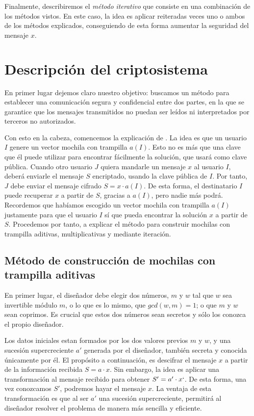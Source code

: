     Finalmente, describiremos el \textit{método iterativo} que consiste en una combinación de los métodos vistos. En este caso, la idea es aplicar reiteradas veces uno o ambos de los métodos explicados, conseguiendo de esta forma aumentar la seguridad del mensaje $x$.

    \section{Descripción del criptosistema}

    En primer lugar dejemos claro nuestro objetivo: buscamos un método para establecer una comunicación segura y confidencial entre dos partes, en la que se garantice que los mensajes transmitidos no puedan ser leídos ni interpretados por terceros no autorizados.

    Con esto en la cabeza, comencemos la explicación de \cite{artMH}. La idea es que un usuario $I$ genere un vector mochila con trampilla $a(I)$. Esto no es más que una clave que él puede utilizar para encontrar fácilmente la solución, que usará como clave pública. Cuando otro usuario $J$ quiera mandarle un mensaje $x$ al usuario $I$, deberá enviarle el mensaje $S$ encriptado, usando la clave pública de $I$. Por tanto, $J$ debe enviar el mensaje cifrado $S = x \cdot a(I)$. De esta forma, el destinatario $I$ puede recuperar $x$ a partir de $S$, gracias a $a(I)$, pero nadie más podrá. Recordemos que habíamos escogido un vector mochila con trampilla $a(I)$ justamente para que el usuario $I$ sí que pueda encontrar la solución $x$ a partir de $S$. Procedemos por tanto, a explicar el método para construir mochilas con trampilla aditivas, multiplicativas y mediante iteración. 
    
    \subsection{Método de construcción de mochilas con trampilla aditivas} \label{sec:3.3.1}
    
    En primer lugar, el diseñador debe elegir dos números, $m$ y $w$ tal que $w$ sea invertible módulo $m$, o lo que es lo mismo, que $gcd(w,m) = 1$; o que $m$ y $w$ sean coprimos. Es crucial que estos dos números sean secretos y sólo los conozca el propio diseñador.

    Los datos iniciales estan formados por los dos valores previos $m$ y $w$, y una sucesión supercreciente $a'$ generada por el diseñador, también secreta y conocida únicamente por él. El propósito a continuación, es descifrar el mensaje $x$ a partir de la información recibida $S = a \cdot x$. Sin embargo, la idea es aplicar una transformación al mensaje recibido para obtener $S' = a' \cdot x`$. De esta forma, una vez conozcamos $S'$, podremos hayar el mensaje $x$. La ventaja de esta transformación es que al ser $a'$ una sucesión supercreciente, permitirá al diseñador resolver el problema de manera más sencilla y eficiente.

